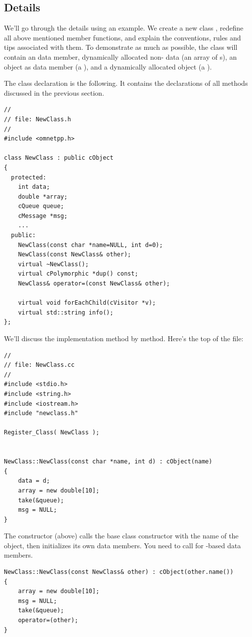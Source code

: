 \subsection{Details}

We'll go through the details using an example. We create a new
class , redefine all above mentioned 
member functions, and explain the conventions, rules and tips
associated with them.
To demonstrate as much as possible, the class will contain
an  data member, dynamically allocated non- data
(an array of s),
an {\opp} object as data member (a ), and
a dynamically allocated {\opp} object (a ).

The class declaration is the following. It contains the declarations
of all methods discussed in the previous section.

\begin{verbatim}
//
// file: NewClass.h
//
#include <omnetpp.h>

class NewClass : public cObject
{
  protected:
    int data;
    double *array;
    cQueue queue;
    cMessage *msg;
    ...
  public:
    NewClass(const char *name=NULL, int d=0);
    NewClass(const NewClass& other);
    virtual ~NewClass();
    virtual cPolymorphic *dup() const;
    NewClass& operator=(const NewClass& other);

    virtual void forEachChild(cVisitor *v);
    virtual std::string info();
};
\end{verbatim}

We'll discuss the implementation method by method.
Here's the top of the  file:

\begin{verbatim}
//
// file: NewClass.cc
//
#include <stdio.h>
#include <string.h>
#include <iostream.h>
#include "newclass.h"

Register_Class( NewClass );


NewClass::NewClass(const char *name, int d) : cObject(name)
{
    data = d;
    array = new double[10];
    take(&queue);
    msg = NULL;
}
\end{verbatim}

The constructor (above) calls the base class constructor with
the name of the object, then initializes its own data members.
You need to call  for -based data members.


\begin{verbatim}
NewClass::NewClass(const NewClass& other) : cObject(other.name())
{
    array = new double[10];
    msg = NULL;
    take(&queue);
    operator=(other);
}
\end{verbatim}

